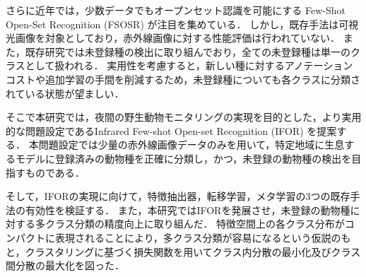 \documentclass[uplatex,dvipdfmx,10pt,twocolumn]{jsarticle}
\begin{document}
さらに近年では，少数データでもオープンセット認識を可能にする Few-Shot Open-Set Recognition (FSOSR) が注目を集めている．
しかし，既存手法は可視光画像を対象としており，赤外線画像に対する性能評価は行われていない．
また，既存研究では未登録種の検出に取り組んでおり，全ての未登録種は単一のクラスとして扱われる．
実用性を考慮すると，新しい種に対するアノテーションコストや追加学習の手間を削減するため，未登録種についても各クラスに分類されている状態が望ましい．

そこで本研究では，夜間の野生動物モニタリングの実現を目的とした，より実用的な問題設定であるInfrared Few-shot Open-set Recognition (IFOR) を提案する．
本問題設定では少量の赤外線画像データのみを用いて，特定地域に生息するモデルに登録済みの動物種を正確に分類し，かつ，未登録の動物種の検出を目指すものである．

そして，IFORの実現に向けて，特徴抽出器，転移学習，メタ学習の3つの既存手法の有効性を検証する．
また，本研究ではIFORを発展させ，未登録の動物種に対する多クラス分類の精度向上に取り組んだ．
特徴空間上の各クラス分布がコンパクトに表現されることにより，多クラス分類が容易になるという仮説のもと，クラスタリングに基づく損失関数を用いてクラス内分散の最小化及びクラス間分散の最大化を図った．
\end{document}
